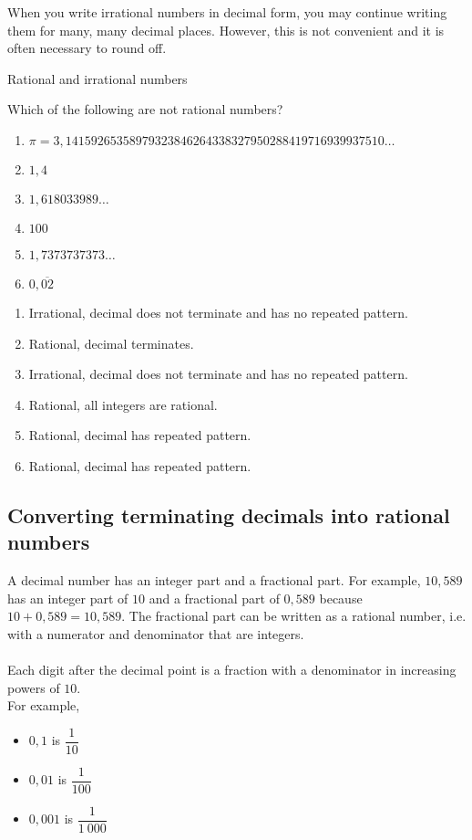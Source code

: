 \par
When you write irrational numbers in decimal form, you may continue writing them for many, many
decimal places. However, this is not convenient and it is often necessary to round off.


\begin{wex}{Rational and irrational numbers}
{Which of the following are not rational numbers?\\
\begin{enumerate}[itemsep=5pt, label=\textbf{\arabic*}. ] 
\item $\pi =3,14159265358979323846264338327950288419716939937510\ldots$
\item $1,4$
\item $1,618033989\ldots$
\item $100$
\item $1,7373737373\ldots$
\item $0,\overline{02}$
\end{enumerate}}
{
\begin{enumerate}[itemsep=5pt, label=\textbf{\arabic*}. ] 
\item Irrational, decimal does not terminate and has no repeated pattern. 
\item Rational, decimal terminates.
\item Irrational, decimal does not terminate and has no repeated pattern. 
\item Rational, all integers are rational.
\item Rational, decimal has repeated pattern.
\item Rational, decimal has repeated pattern.
\end{enumerate}
}
\end{wex}

\subsection{Converting terminating decimals into rational numbers}

A decimal number has an integer part and a fractional part. For example, $10,589$ has an integer part of $10$ and a fractional part of $0,589$ because $10+0,589=10,589$. The fractional part can be written as a rational number, i.e.\@{} with a numerator and denominator that are integers. \\
\\
Each digit after the decimal point is a fraction with a denominator in increasing powers of $10$.\\ For example,
\begin{itemize}
\item $0,1$ is $\dfrac{1}{10}$
\item $0,01$ is $\dfrac{1}{100}$
\item $0,001$ is $\dfrac{1}{1~000}$
\end{itemize}

